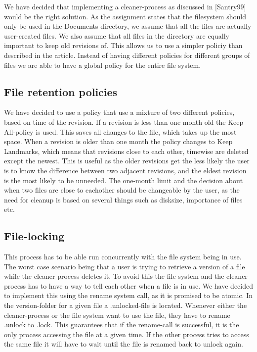 \documentclass[12pt]{article}
\begin{document}
We have decided that implementing a cleaner-process as discussed in [Santry99] would be the right solution. As the assignment states that the filesystem should only be used in the Documents directory, we assume that all the files are actually user-created files. We also assume that all files in the directory are equally important to keep old revisions of. This allows us to use a simpler policiy than described in the article. Instead of having different policies for different groups of files we are able to have a global policy for the entire file system.

\subsection{File retention policies}
We have decided to use a policy that use a mixture of two different policies, based on time of the revision. If a revision is less than one month old the Keep All-policy is used. This saves all changes to the file, which takes up the most space. When a revision is older than one month the policy changes to Keep Landmarks, which means that revisions close to each other, timewise are deleted except the newest. This is useful as the older revisions get the less likely the user is to know the difference between two adjacent revisions, and the eldest revision is the most likely to be unneeded.
The one-month limit and the decision about when two files are close to eachother should be changeable by the user, as the need for cleanup is based on several things such as disksize, importance of files etc.

\subsection{File-locking}
This process has to be able run concurrently with the file system being in use. The worst case scenario being that a user is trying to retrieve a version of a file while the cleaner-process deletes it. To avoid this the file system and the cleaner-process has to have a way to tell each other when a file is in use. We have decided to implement this using the rename system call, as it is promised to be atomic. In the version-folder for a given file a .unlocked-file is located. Whenever either the cleaner-process or the file system want to use the file, they have to rename .unlock to .lock. This guarantees that if the rename-call is successful, it is the only process accessing the file at a given time. If the other process tries to access the same file it will have to wait until the file is renamed back to unlock again.
\end{document}
